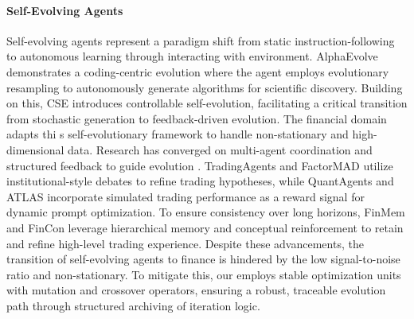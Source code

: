 \paragraph{Self-Evolving Agents} Self-evolving agents \cite{fang2025comprehensive, zhai2025agentevolver, lin2025se, zhang2026evofsm} represent a paradigm shift from static instruction-following to autonomous learning through interacting with environment. 
AlphaEvolve \cite{novikov2025alphaevolve} demonstrates a coding-centric evolution where the agent employs evolutionary resampling to autonomously generate algorithms for scientific discovery. Building on this, CSE \cite{hu2026controlled} introduces controllable self-evolution, facilitating a critical transition from stochastic generation to feedback-driven evolution.
The financial domain adapts thi s self-evolutionary framework to handle non-stationary and high-dimensional data. Research has converged on multi-agent coordination and structured feedback to guide evolution \cite{li2025hedgeagents}. TradingAgents \cite{xiao2025trad} and FactorMAD \cite{duan2025factormad} utilize institutional-style debates to refine trading hypotheses, while QuantAgents \cite{li2025quantagents} and ATLAS \cite{papadakis2025atlas} incorporate simulated trading performance as a reward signal for dynamic prompt optimization. To ensure consistency over long horizons, FinMem \cite{yu2025finmem} and FinCon \cite{yu2024fincon} leverage hierarchical memory and conceptual reinforcement to retain and refine high-level trading experience.
Despite these advancements, the transition of self-evolving agents to finance is hindered by the low signal-to-noise ratio and non-stationary. To mitigate this, our \method employs stable optimization units with mutation and crossover operators, ensuring a robust, traceable evolution path through structured archiving of iteration logic.
  